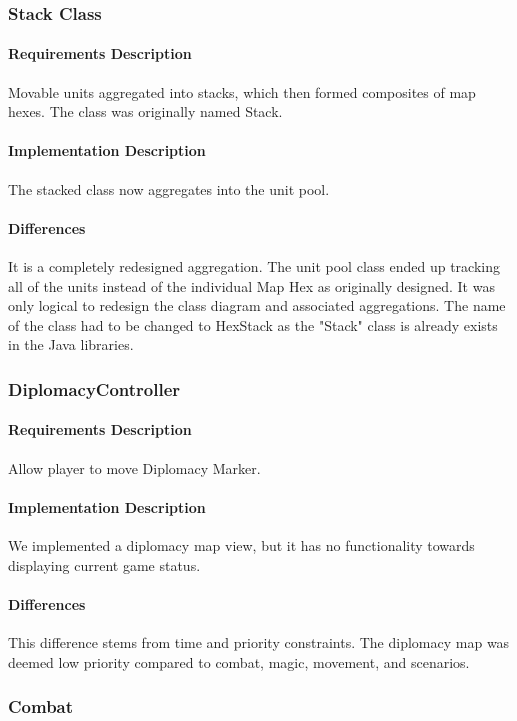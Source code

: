 \documentclass[12pt,a4paper,titlepage]{article}
\begin{document}
\subsubsection{Stack Class} 
\paragraph{Requirements Description} Movable units aggregated into stacks, which then formed composites of map hexes. The class was originally named Stack.
\paragraph{Implementation Description} The stacked class now aggregates into the unit pool.
\paragraph{Differences} It is a completely redesigned aggregation.  The unit pool class ended up tracking all of the units instead of the individual Map Hex as originally designed.  It was only logical to redesign the class diagram and associated aggregations. The name of the class had to be changed to HexStack as the "Stack" class is already exists in the Java libraries.

\subsubsection{DiplomacyController} 
\paragraph{Requirements Description} Allow player to move Diplomacy Marker.
\paragraph{Implementation Description} We implemented a diplomacy map view, but it has no functionality towards displaying current game status.
\paragraph{Differences} This difference stems from time and priority constraints. The diplomacy map was deemed low priority compared to combat, magic, movement, and scenarios.

\subsubsection{Combat}
\end{document}
